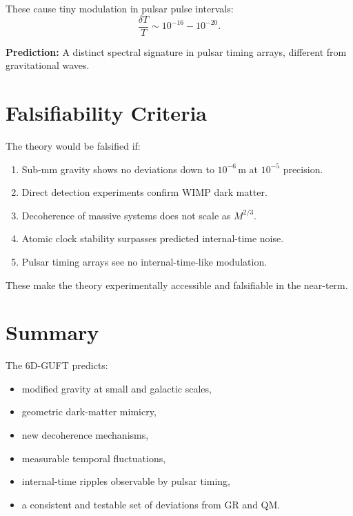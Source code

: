 \documentclass[12pt]{article}
\begin{document}
These cause tiny modulation in pulsar pulse intervals:
\[
\frac{\delta T}{T} \sim 10^{-16} - 10^{-20}.
\]

\textbf{Prediction:}  
A distinct spectral signature in pulsar timing arrays, different from
gravitational waves.


\newpage
\section{Falsifiability Criteria}

The theory would be falsified if:
\begin{enumerate}
\item Sub-mm gravity shows no deviations down to \(10^{-6}\,\mathrm{m}\) at \(10^{-5}\) precision.
\item Direct detection experiments confirm WIMP dark matter.
\item Decoherence of massive systems does not scale as \(M^{2/3}\).
\item Atomic clock stability surpasses predicted internal-time noise.
\item Pulsar timing arrays see no internal-time-like modulation.
\end{enumerate}

These make the theory experimentally accessible and falsifiable in the
near-term.


\newpage
\section{Summary}

The 6D-GUFT predicts:
\begin{itemize}
\item modified gravity at small and galactic scales,
\item geometric dark-matter mimicry,
\item new decoherence mechanisms,
\item measurable temporal fluctuations,
\item internal-time ripples observable by pulsar timing,
\item a consistent and testable set of deviations from GR and QM.
\end{itemize}

\end{document}
